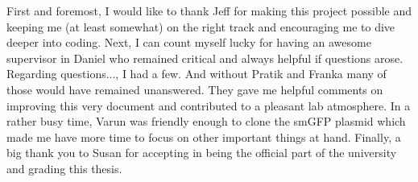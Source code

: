 First and foremost, I would like to thank Jeff for making this project possible and keeping me (at least somewhat) on the right track and encouraging me to dive deeper into coding. 
Next, I can count myself lucky for having an awesome supervisor in Daniel who remained critical and always helpful if questions arose. 
Regarding questions..., I had a few.
And without Pratik and Franka many of those would have remained unanswered.
They gave me helpful comments on improving this very document and contributed to a pleasant lab atmosphere.
In a rather busy time, Varun was friendly enough to clone the smGFP plasmid which made me have more time to focus on other important things at hand.
Finally, a big thank you to Susan for accepting in being the official part of the university and grading this thesis.
